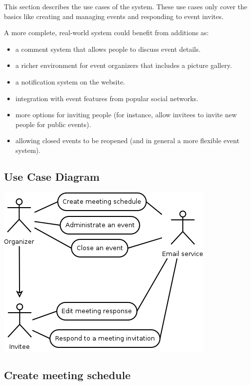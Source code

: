 \label{sec:usecases}
This section describes the use cases of the system. These use cases only cover the basics like creating and managing events and responding to event invites.

A more complete, real-world system could benefit from additions as:
\begin{itemize}
	\item a comment system that allows people to discuss event details.
	\item a richer environment for event organizers that includes a picture gallery.
	\item a notification system on the website.
	\item integration with event features from popular social networks.
	\item more options for inviting people (for instance, allow invitees to invite new people for public events).
	\item allowing closed events to be reopened (and in general a more flexible event system).
\end{itemize}
\subsection{Use Case Diagram}
\includegraphics{ucd/ucd.png}
\pagebreak
\subsection{Create meeting schedule}

